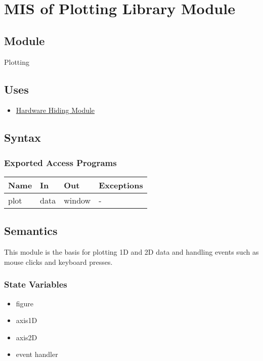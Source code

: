 \documentclass[12pt, titlepage]{article}
\begin{document}
\section{MIS of Plotting Library Module} \label{Mod:Plotting}

\subsection{Module}

Plotting

\subsection{Uses}
\begin{itemize}
    \item \hyperref[Mod:HH]{Hardware Hiding Module}
\end{itemize}

\subsection{Syntax}

\subsubsection{Exported Access Programs}

\begin{center}
\begin{tabular}{p{2cm} p{4cm} p{4cm} p{2cm}}
\hline
\textbf{Name} & \textbf{In} & \textbf{Out} & \textbf{Exceptions} \\
\hline
plot & data & window & - \\
\hline
\end{tabular}
\end{center}

\subsection{Semantics}
This module is the basis for plotting 1D and 2D data and handling events such as mouse clicks and keyboard presses.
 
\subsubsection{State Variables}
\begin{itemize}
    \item figure
    \item axis1D
    \item axis2D
    \item event handler
\end{itemize}
\end{document}
